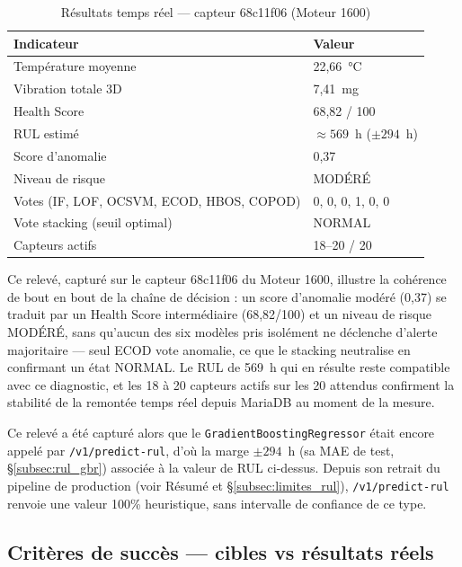 \documentclass[12pt,a4paper]{report}
\begin{document}
\begin{table}[H]
\centering
\caption{Résultats temps réel — capteur 68c11f06 (Moteur 1600)}
\begin{tabular}{ll}
\toprule
\textbf{Indicateur} & \textbf{Valeur} \\
\midrule
Température moyenne      & 22,66~°C \\
Vibration totale 3D      & 7,41~mg \\
Health Score             & 68,82 / 100 \\
RUL estimé               & $\approx 569$~h ($\pm 294$~h) \\
Score d'anomalie         & 0,37 \\
Niveau de risque         & MODÉRÉ \\
Votes (IF, LOF, OCSVM, ECOD, HBOS, COPOD) & 0, 0, 0, 1, 0, 0 \\
Vote stacking (seuil optimal) & NORMAL \\
Capteurs actifs          & 18--20 / 20 \\
\bottomrule
\end{tabular}
\end{table}

Ce relevé, capturé sur le capteur 68c11f06 du Moteur 1600, illustre la cohérence de bout en
bout de la chaîne de décision : un score d'anomalie modéré (0,37) se traduit par un Health
Score intermédiaire (68,82/100) et un niveau de risque MODÉRÉ, sans qu'aucun des six modèles
pris isolément ne déclenche d'alerte majoritaire — seul ECOD vote anomalie, ce que le
stacking neutralise en confirmant un état NORMAL. Le RUL de 569~h qui en résulte reste
compatible avec ce diagnostic, et les 18 à 20 capteurs actifs sur les 20 attendus
confirment la stabilité de la remontée temps réel depuis MariaDB au moment de la mesure.

\begin{correctionbox}
Ce relevé a été capturé alors que le \texttt{GradientBoostingRegressor} était encore
appelé par \texttt{/v1/predict-rul}, d'où la marge $\pm294$~h (sa MAE de test,
\S\ref{subsec:rul_gbr}) associée à la valeur de RUL ci-dessus. Depuis son retrait du
pipeline de production (voir Résumé et \S\ref{subsec:limites_rul}), \texttt{/v1/predict-rul}
renvoie une valeur 100\% heuristique, sans intervalle de confiance de ce type.
\end{correctionbox}

\subsection{Critères de succès — cibles vs résultats réels}
\end{document}

